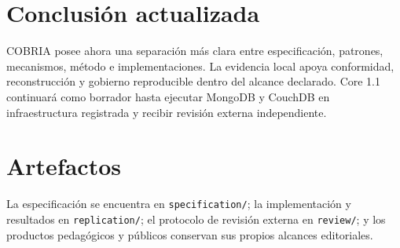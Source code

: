 \documentclass[11pt]{article}
\begin{document}
\section*{Conclusión actualizada}
COBRIA posee ahora una separación más clara entre especificación, patrones, mecanismos, método e implementaciones. La evidencia local apoya conformidad, reconstrucción y gobierno reproducible dentro del alcance declarado. Core 1.1 continuará como borrador hasta ejecutar MongoDB y CouchDB en infraestructura registrada y recibir revisión externa independiente.

\section*{Artefactos}
La especificación se encuentra en \texttt{specification/}; la implementación y resultados en \texttt{replication/}; el protocolo de revisión externa en \texttt{review/}; y los productos pedagógicos y públicos conservan sus propios alcances editoriales.
\end{document}
